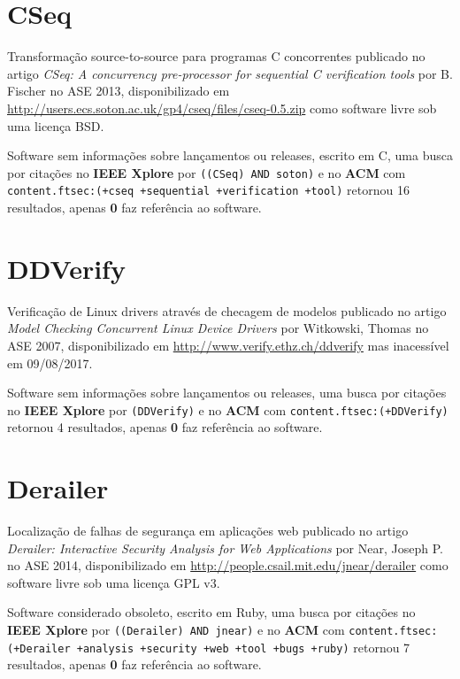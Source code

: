 \section{CSeq}

Transformação source-to-source para programas C concorrentes
publicado no artigo {\it CSeq: A concurrency pre-processor for sequential C verification tools}
por B. Fischer
no ASE 2013,
disponibilizado em \url{http://users.ecs.soton.ac.uk/gp4/cseq/files/cseq-0.5.zip}
como software livre
sob uma licença BSD.

Software sem informações sobre lançamentos ou releases,
escrito em C,
uma busca por citações no {\bf IEEE Xplore} por
\texttt{((CSeq) AND soton)}
e no {\bf ACM} com
\texttt{content.ftsec:(+cseq +sequential +verification +tool)}
retornou
16 resultados, apenas
{\bf 0} faz referência ao software.



\section{DDVerify}

Verificação de Linux drivers através de checagem de modelos
publicado no artigo {\it Model Checking Concurrent Linux Device Drivers}
por Witkowski, Thomas
no ASE 2007,
disponibilizado em \url{http://www.verify.ethz.ch/ddverify}
mas inacessível em 09/08/2017.

Software sem informações sobre lançamentos ou releases,
uma busca por citações no {\bf IEEE Xplore} por
\texttt{(DDVerify)}
e no {\bf ACM} com
\texttt{content.ftsec:(+DDVerify)}
retornou
4 resultados, apenas
{\bf 0} faz referência ao software.



\section{Derailer}

Localização de falhas de segurança em aplicações web
publicado no artigo {\it Derailer: Interactive Security Analysis for Web Applications}
por Near, Joseph P.
no ASE 2014,
disponibilizado em \url{http://people.csail.mit.edu/jnear/derailer}
como software livre
sob uma licença GPL v3.

Software considerado obsoleto,
escrito em Ruby,
uma busca por citações no {\bf IEEE Xplore} por
\texttt{((Derailer) AND jnear)}
e no {\bf ACM} com
\texttt{content.ftsec:(+Derailer +analysis +security +web +tool +bugs +ruby)}
retornou
7 resultados, apenas
{\bf 0} faz referência ao software.



